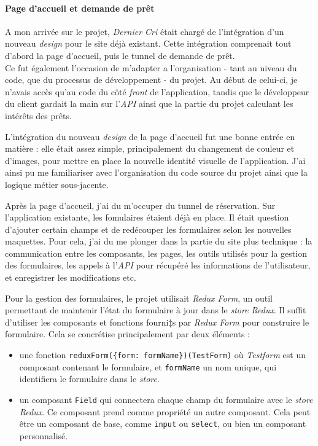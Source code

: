 \documentclass[12pt,a4paper]{article}
\providecommand{\tightlist}{%
  \setlength{\itemsep}{0pt}\setlength{\parskip}{0pt}}
\begin{document}
  \paragraph{Page d'accueil et demande de
  prêt}\label{page-daccueil-et-demande-de-pruxeat}

  \bigskip

  A mon arrivée sur le projet, \emph{Dernier Cri} était chargé de
  l'intégration d'un nouveau \emph{design} pour le site déjà existant.
  Cette intégration comprenait tout d'abord la page d'accueil, puis le
  tunnel de demande de prêt.\\
  Ce fut également l'occasion de m'adapter a l'organisation - tant au
  niveau du code, que du processus de développement - du projet. Au début
  de celui-ci, je n'avais accès qu'au code du côté \emph{front} de
  l'application, tandis que le développeur du client gardait la main sur
  l'\emph{API} ainsi que la partie du projet calculant les intérêts des
  prêts.

  \bigskip

  L'intégration du nouveau \emph{design} de la page d'accueil fut une
  bonne entrée en matière : elle était assez simple, principalement du
  changement de couleur et d'images, pour mettre en place la nouvelle
  identité visuelle de l'application. J'ai ainsi pu me familiariser avec
  l'organisation du code source du projet ainsi que la logique métier
  sous-jacente.

  \bigskip

  Après la page d'accueil, j'ai du m'occuper du tunnel de réservation. Sur
  l'application existante, les fomulaires étaient déjà en place. Il était
  question d'ajouter certain champs et de redécouper les formulaires selon
  les nouvelles maquettes. Pour cela, j'ai du me plonger dans la partie du
  site plus technique : la communication entre les composants, les pages,
  les outils utilisés pour la gestion des formulaires, les appels à
  l'\emph{API} pour récupéré les informations de l'utilisateur, et
  enregistrer les modifications etc.

  \bigskip

  Pour la gestion des formulaires, le projet utilisait \emph{Redux Form},
  un outil permettant de maintenir l'état du formulaire à jour dans le
  \emph{store Redux}. Il suffit d'utiliser les composants et fonctions
  fourni‡s par \emph{Redux Form} pour construire le formulaire. Cela se
  concrétise principalement par deux éléments :

  \begin{itemize}
  \tightlist
  \item
    une fonction
    \texttt{reduxForm(\{form:\ \textquotesingle{}formName\textquotesingle{}\})(TestForm)}
    où \emph{Testform} est un composant contenant le formulaire, et
    \texttt{formName} un nom unique, qui identifiera le formulaire dans le
    \emph{store}.
  \item
    un composant \texttt{Field} qui connectera chaque champ du formulaire
    avec le \emph{store Redux}. Ce composant prend comme propriété un
    autre composant. Cela peut être un composant de base, comme
    \texttt{input} ou \texttt{select}, ou bien un composant personnalisé.
  \end{itemize}
\end{document}
